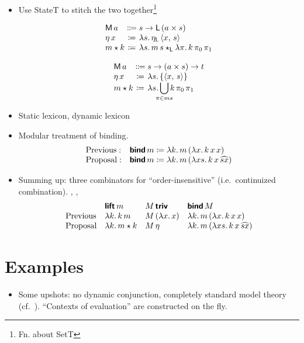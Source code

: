 \begin{itemize}
	\item Use StateT to stitch the two together\footnote{Fn. about SetT}
	\begin{defi}\label{statet}
		\[\begin{array}[t]
			{@{}l@{}c@{}l@{}}
			\textsf{M}\,a &{}\Coloneqq{} &s \ra \textsf{L}\,(a \times s)%
			\\
			\eta\,x &{}\ceq{} &\lambda s .\,\eta_\textsf{L}\,\ab{x,\,s}
			\\
			m \star k &{}\ceq{} &\lambda s.\, m\,s\star_\textsf{L} \lambda \pi.\,k\,\pi_0\,\pi_1%
		\end{array}\]
	\end{defi}
	\begin{defi}\label{stateset}
		\[\begin{array}[t]
			{@{}l@{}c@{}l@{}}
			\textsf{M}\,a &{}\Coloneqq{} &s \ra (a \times s) \ra t%
			\\
			\eta\,x &{}\ceq{} &\lambda s.\left\{\ab{x,\,s}\right\}
			\\
			m \star k &{}\ceq{} &\lambda s.\displaystyle\bigcup_{\mathclap{\pi \in ms}}k\,\pi_0\,\pi_1%
		\end{array}\]
	\end{defi}
	

	\item Static lexicon, dynamic lexicon
	
	\item Modular treatment of binding.%
	\[\begin{array}{ll}
		\text{Previous}:& \bsf{bind}\,m \ceq \lambda k.\,m\,(\lambda x.\,k\,x\,x)%
		\\
		\text{Proposal}:& \bsf{bind}\,m \ceq \lambda k.\,m\,(\lambda xs.\,k\,x\,\widehat{sx})%
	\end{array}\]
	
	\item Summing up: three combinators for ``order-insensitive'' (i.e.~continuized combination). , , %
	\[\begin{array}{lllll}
		& \bsf{lift}\,m & M\,\bsf{triv} & \bsf{bind}\,M %
		\\
		\text{Previous} & \lambda k.\,k\,m & M\,(\lambda x.\,x) & \lambda k.\,m\,(\lambda x.\,k\,x\,x)%
		\\
		\text{Proposal} & \lambda k.\,m \star k & M\,\eta & \lambda k.\,m\,(\lambda xs.\,k\,x\,\widehat{sx})%
	\end{array}\]
\end{itemize}

\section{Examples}
\begin{itemize}
	\item Some upshots: no dynamic conjunction, completely standard model theory (cf.~\citealt{Groote:2006}). ``Contexts of evaluation'' are constructed on the fly. %
	\end{itemize}

\citealt{Groote:2001}
\citealt{Charlow:diss}
\citealt{Bumford:inc}

{\small}
